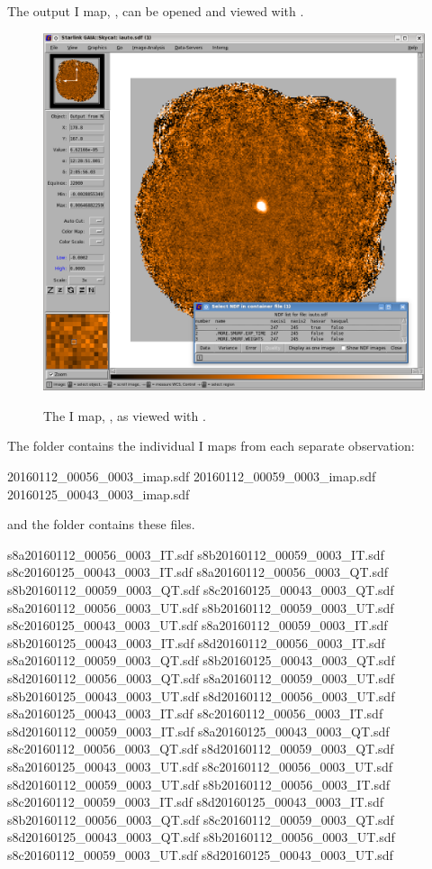 The output I map, , can be opened and viewed with \GAIA.

\begin{figure}[t!]
\begin{center}
\includegraphics[width=0.8\linewidth]{sc22-gaia-view-iauto.png}
\label{fig:gaia-iauto}
\caption [I map in GAIA]{
  \small The I map, , as viewed with \GAIA.
}
\end{center}
\end{figure}

The  folder contains the individual I maps from each separate
observation:

\begin{terminalv}
20160112_00056_0003_imap.sdf  20160112_00059_0003_imap.sdf  20160125_00043_0003_imap.sdf
\end{terminalv}

and the  folder contains these files.

\begin{terminalv}
s8a20160112_00056_0003_IT.sdf  s8b20160112_00059_0003_IT.sdf  s8c20160125_00043_0003_IT.sdf
s8a20160112_00056_0003_QT.sdf  s8b20160112_00059_0003_QT.sdf  s8c20160125_00043_0003_QT.sdf
s8a20160112_00056_0003_UT.sdf  s8b20160112_00059_0003_UT.sdf  s8c20160125_00043_0003_UT.sdf
s8a20160112_00059_0003_IT.sdf  s8b20160125_00043_0003_IT.sdf  s8d20160112_00056_0003_IT.sdf
s8a20160112_00059_0003_QT.sdf  s8b20160125_00043_0003_QT.sdf  s8d20160112_00056_0003_QT.sdf
s8a20160112_00059_0003_UT.sdf  s8b20160125_00043_0003_UT.sdf  s8d20160112_00056_0003_UT.sdf
s8a20160125_00043_0003_IT.sdf  s8c20160112_00056_0003_IT.sdf  s8d20160112_00059_0003_IT.sdf
s8a20160125_00043_0003_QT.sdf  s8c20160112_00056_0003_QT.sdf  s8d20160112_00059_0003_QT.sdf
s8a20160125_00043_0003_UT.sdf  s8c20160112_00056_0003_UT.sdf  s8d20160112_00059_0003_UT.sdf
s8b20160112_00056_0003_IT.sdf  s8c20160112_00059_0003_IT.sdf  s8d20160125_00043_0003_IT.sdf
s8b20160112_00056_0003_QT.sdf  s8c20160112_00059_0003_QT.sdf  s8d20160125_00043_0003_QT.sdf
s8b20160112_00056_0003_UT.sdf  s8c20160112_00059_0003_UT.sdf  s8d20160125_00043_0003_UT.sdf
\end{terminalv}


